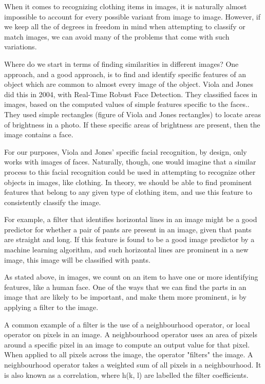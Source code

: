 \documentclass[12pt]{article} %
\begin{document}
	When it comes to recognizing clothing items in images, it is naturally almost impossible to account for every possible variant from image to image. However, if we keep all the of degrees in freedom in mind when attempting to classify or match images, we can avoid many of the problems that come with such variations. 

Where do we start in terms of finding similarities in different images? One approach, and a good approach, is to find and identify specific features of an object which are common to almost every image of the object. Viola and Jones did this in 2004, with Real-Time Robust Face Detection. They classified faces in images, based on the computed values of simple features specific to the faces.\cite{viola2004robust}. They used simple rectangles (figure of Viola and Jones rectangles) to locate areas of brightness in a photo. If these specific areas of brightness are present, then the image contains a face. 

For our purposes, Viola and Jones' specific facial recognition, by design, only works with images of faces. Naturally, though, one would imagine that a similar process to this facial recognition could be used in attempting to recognize other objects in images, like clothing. In theory, we should be able to find prominent features that belong to any given type of clothing item, and use this feature to consistently classify the image.

	
	
For example, a filter that identifies horizontal lines in an image might be a good predictor for whether a pair of pants are present in an image, given that pants are straight and long. If this feature is found to be a good image predictor by a machine learning algorithm, and such horizontal lines are prominent in a new image, this image will be classified with pants. 
	
		
	 As stated above, in images, we count on an item to have one or more identifying features, like a human face. One of the ways that we can find the parts in an image that are likely to be important, and make them more prominent, is by applying a filter to the image. 

A common example of a filter is the use of a neighbourhood operator, or local operator on pixels in an image. A neighbourhood operator uses an area of pixels around a specific pixel in an image to compute an output value for that pixel. When applied to all pixels across the image, the operator "filters" the image. A neighbourhood operator takes a weighted sum of all pixels in a neighbourhood. It is also known as a correlation, where h(k, l) are labelled the filter coefficients. 
	
\end{document}
